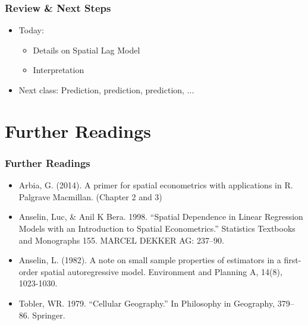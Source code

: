 \documentclass[
  shownotes,
  xcolor={svgnames},
  hyperref={colorlinks,citecolor=DarkBlue,linkcolor=DarkRed,urlcolor=DarkBlue}
  , aspectratio=169]{beamer}
\begin{document}
\begin{frame}
\frametitle{Review \& Next Steps}
  
  \begin{itemize} 
    \item Today:
    \medskip
    \begin{itemize} 
        \item Details on Spatial Lag Model
        \medskip
        \item Interpretation
        \medskip
      \end{itemize}
  	\bigskip  

	\item  Next class: Prediction, prediction, prediction, ...




\end{itemize}
\end{frame}

\section{Further Readings}
\begin{frame}
\frametitle{Further Readings}

\begin{itemize}

   
  \item Arbia, G. (2014). A primer for spatial econometrics with applications in R. Palgrave Macmillan. (Chapter 2 and 3)
  \medskip
  \item Anselin, Luc, \& Anil K Bera. 1998. “Spatial Dependence in Linear Regression Models with an Introduction to Spatial Econometrics.” Statistics Textbooks and Monographs 155. MARCEL DEKKER AG: 237–90.
  \medskip
  \item Anselin, L. (1982). A note on small sample properties of estimators in a first-order spatial autoregressive model. Environment and Planning A, 14(8), 1023-1030.
  \medskip
  \item Tobler, WR. 1979. “Cellular Geography.” In Philosophy in Geography, 379–86. Springer.
\end{itemize}

\end{frame}






\end{document}

